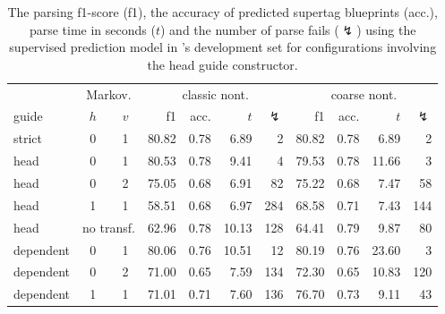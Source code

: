 \documentclass[../../document.tex]{subfiles}
\begin{document}
    \begin{table}
        \caption{\label{tbl:gridsearch:head:2}
        The parsing f1-score (f1), the accuracy of predicted supertag blueprints (acc.), parse time in seconds ($t$) and the number of parse fails ($\lightning$) using the supervised prediction model in \negra{}'s development set for configurations involving the head guide constructor.
        }
        \centering
        \vspace{.2cm}
        \begin{tabular}{lcc|rrrr|rrrr}
            \toprule
            & \multicolumn{2}{c|}{Markov.} & \multicolumn{4}{c|}{classic nont.} &  \multicolumn{4}{c}{coarse nont.} \\
guide           & \(h\) & \(v\) & f1 & acc. & $t$ & $\lightning$ & f1 & acc. & $t$ & $\lightning$  \\ \hline \rowcolor{black!10}
strict & 0 & 1                         & 80.82 & 0.78 &  6.89 &   2 & 80.82 & 0.78 &  6.89 &   2 \\  \hline
head & 0 & 1                           & 80.53 & 0.78 &  9.41 &   4 & 79.53 & 0.78 & 11.66 &   3 \\
head & 0 & 2                           & 75.05 & 0.68 &  6.91 &  82 & 75.22 & 0.68 &  7.47 &  58 \\
head & 1 & 1                           & 58.51 & 0.68 &  6.97 & 284 & 68.58 & 0.71 &  7.43 & 144 \\
head & \multicolumn{2}{c|}{no transf.} & 62.96 & 0.78 & 10.13 & 128 & 64.41 & 0.79 &  9.87 &  80 \\\hline
dependent & 0 & 1                      & 80.06 & 0.76 & 10.51 &  12 & 80.19 & 0.76 & 23.60 &   3 \\
dependent & 0 & 2                      & 71.00 & 0.65 &  7.59 & 134 & 72.30 & 0.65 & 10.83 & 120 \\
dependent & 1 & 1                      & 71.01 & 0.71 &  7.60 & 136 & 76.70 & 0.73 &  9.11 &  43 \\
\bottomrule
        \end{tabular}
    \end{table}
\end{document}
